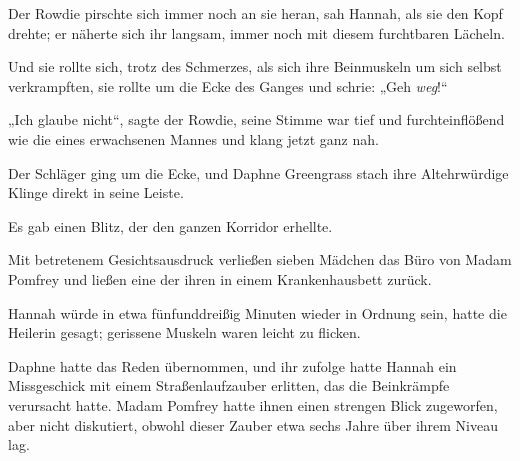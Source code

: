 Der Rowdie pirschte sich immer noch an sie heran, sah Hannah, als sie den Kopf drehte; er näherte sich ihr langsam, immer noch mit diesem furchtbaren Lächeln.

Und sie rollte sich, trotz des Schmerzes, als sich ihre Beinmuskeln um sich selbst verkrampften, sie rollte um die Ecke des Ganges und schrie: „Geh \emph{weg}!“

„Ich glaube nicht“, sagte der Rowdie, seine Stimme war tief und furchteinflößend wie die eines erwachsenen Mannes und klang jetzt ganz nah.

Der Schläger ging um die Ecke, und Daphne Greengrass stach ihre Altehrwürdige Klinge direkt in seine Leiste.

Es gab einen Blitz, der den ganzen Korridor erhellte.

\later

Mit betretenem Gesichtsausdruck verließen sieben Mädchen das Büro von Madam Pomfrey und ließen eine der ihren in einem Krankenhausbett zurück.

Hannah würde in etwa fünfunddreißig Minuten wieder in Ordnung sein, hatte die Heilerin gesagt; gerissene Muskeln waren leicht zu flicken.

Daphne hatte das Reden übernommen, und ihr zufolge hatte Hannah ein Missgeschick mit einem Straßenlaufzauber erlitten, das die Beinkrämpfe verursacht hatte. Madam Pomfrey hatte ihnen einen strengen Blick zugeworfen, aber nicht diskutiert, obwohl dieser Zauber etwa sechs Jahre über ihrem Niveau lag.

